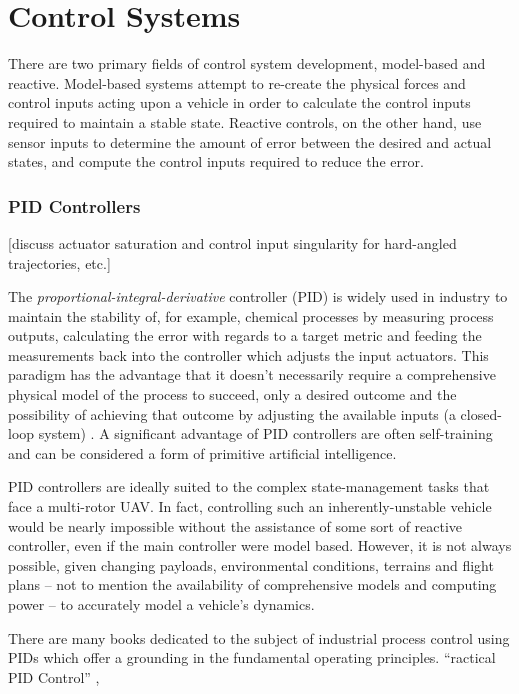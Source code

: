 \documentclass[10pt]{article}
\begin{document}
\section{Control Systems}

There are two primary fields of control system development, model-based and reactive. Model-based systems attempt to re-create the physical forces and control inputs acting upon a vehicle in order to calculate the control inputs required to maintain a stable state. Reactive controls, on the other hand, use sensor inputs to determine the amount of error between the desired and actual states, and compute the control inputs required to reduce the error.

\subsubsection{PID Controllers}

[discuss actuator saturation and control input singularity for hard-angled trajectories, etc.]


The \emph{proportional-integral-derivative} controller (PID) is widely used in industry \cite{Soediono1989} to maintain the stability of, for example, chemical processes by measuring process outputs, calculating the error with regards to a target metric and feeding the measurements back into the controller which adjusts the input actuators. This paradigm has the advantage that it doesn’t necessarily require a comprehensive physical model of the process to succeed, only a desired outcome and the possibility of achieving that outcome by adjusting the available inputs (a closed-loop system) 	\cite{Soediono1989}. A significant advantage of PID controllers are often self-training and can be considered a form of primitive artificial intelligence.

PID controllers are ideally suited to the complex state-management tasks that face a multi-rotor UAV. In fact, controlling such an inherently-unstable vehicle would be nearly impossible without the assistance of some sort of reactive controller, even if the main controller were model based. However, it is not always possible, given changing payloads, environmental conditions, terrains and flight plans -- not to mention the availability of comprehensive models and computing power -- to accurately model a vehicle’s dynamics.

There are many books dedicated to the subject of industrial process control using PIDs which offer a grounding in the fundamental operating principles. ``ractical PID Control'' \cite{Soediono1989}, 
\end{document}

